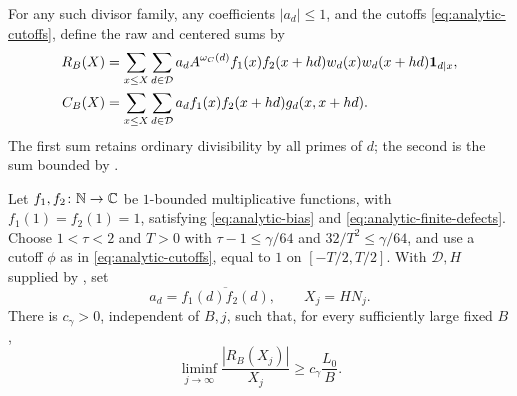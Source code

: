 For any such divisor family, any coefficients $|a_d|\le1$, and the
cutoffs \eqref{eq:analytic-cutoffs}, define the raw and centered sums by
\begin{align}
 R_B(X)&=\sum_{x\le X}\sum_{d\in\mathcal D}
 a_d A^{\omega_C(d)}f_1(x)f_2(x+hd)
 w_d(x)w_d(x+hd)\mathbf 1_{d\mid x},
 \label{eq:raw-sum}\\
 C_B(X)&=\sum_{x\le X}\sum_{d\in\mathcal D}
 a_df_1(x)f_2(x+hd)g_d(x,x+hd).
 \label{eq:analytic-centered-sum}
\end{align}
The first sum retains ordinary divisibility by all primes of $d$;
the second is the sum bounded by .

\begin{lemma}\label{lem:raw-lower-bound}
Let $f_1,f_2\colon\mathbb N\to\mathbb C$ be $1$-bounded multiplicative functions,
with $f_1(1)=f_2(1)=1$, satisfying \eqref{eq:analytic-bias} and
\eqref{eq:analytic-finite-defects}. Choose $1<\tau<2$ and $T>0$ with
$\tau-1\le\gamma/64$ and $32/T^2\le\gamma/64$, and use a cutoff
$\phi$ as in \eqref{eq:analytic-cutoffs}, equal to $1$ on
$[-T/2,T/2]$. With $\mathcal D,H$ supplied by , set
\[
 a_d=\overline{f_1(d)f_2(d)},\qquad X_j=HN_j.
\]
There is $c_\gamma>0$, independent of $B,j$, such that, for every
sufficiently large fixed $B$,
\begin{equation}\label{eq:raw-lower-bound}
 \liminf_{j\to\infty}\frac{|R_B(X_j)|}{X_j}
 \ge c_\gamma\frac{L_0}{B}.
\end{equation}
\end{lemma}
